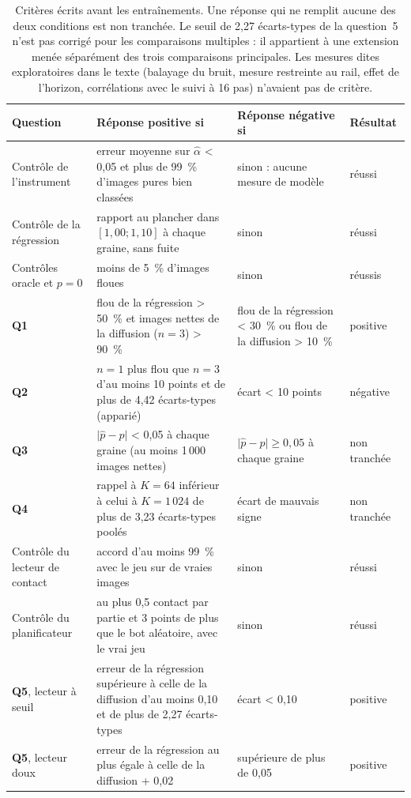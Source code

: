 \documentclass[a4paper, 11pt]{article}
\newcommand{\ahat}{\hat\alpha}
\newcommand{\phat}{\hat p}
\newcommand{\Q}[1]{\textbf{Q#1}}
\begin{document}
\begin{table}[H]
  \centering\footnotesize
  \begin{tabularx}{\linewidth}{@{}lYYl@{}}
    \toprule
    Question & Réponse positive si & Réponse négative si & Résultat \\
    \midrule
    Contrôle de l'instrument & erreur moyenne sur $\ahat$ < 0,05 et plus de 99~\% d'images pures bien classées & sinon : aucune mesure de modèle & réussi \\
    Contrôle de la régression & rapport au plancher dans $[1{,}00 ; 1{,}10]$ à chaque graine, sans fuite & sinon & réussi \\
    Contrôles oracle et $p = 0$ & moins de 5~\% d'images floues & sinon & réussis \\
    \Q1 & flou de la régression > 50~\% et images nettes de la diffusion ($n = 3$) > 90~\% & flou de la régression < 30~\% ou flou de la diffusion > 10~\% & positive \\
    \Q2 & $n = 1$ plus flou que $n = 3$ d'au moins 10 points et de plus de 4,42 écarts-types (apparié) & écart < 10 points & négative \\
    \Q3 & $\lvert\phat - p\rvert$ < 0,05 à chaque graine (au moins 1\,000 images nettes) & $\lvert\phat - p\rvert \ge 0{,}05$ à chaque graine & non tranchée \\
    \Q4 & rappel à $K = 64$ inférieur à celui à $K = 1\,024$ de plus de 3,23 écarts-types poolés & écart de mauvais signe & non tranchée \\
    Contrôle du lecteur de contact & accord d'au moins 99~\% avec le jeu sur de vraies images & sinon & réussi \\
    Contrôle du planificateur & au plus 0,5 contact par partie et 3 points de plus que le bot aléatoire, avec le vrai jeu & sinon & réussi \\
    \Q5, lecteur à seuil & erreur de la régression supérieure à celle de la diffusion d'au moins 0,10 et de plus de 2,27 écarts-types & écart < 0,10 & positive \\
    \Q5, lecteur doux & erreur de la régression au plus égale à celle de la diffusion + 0,02 & supérieure de plus de 0,05 & positive \\
    \bottomrule
  \end{tabularx}
  \caption{Critères écrits avant les entraînements. Une réponse qui ne remplit aucune des deux conditions est non tranchée.
  Le seuil de 2,27 écarts-types de la question~5 n'est pas corrigé pour les comparaisons multiples : il appartient à une
  extension menée séparément des trois comparaisons principales. Les mesures dites exploratoires dans le texte (balayage du
  bruit, mesure restreinte au rail, effet de l'horizon, corrélations avec le suivi à 16 pas) n'avaient pas de critère.}
  \label{tab:criteres}
\end{table}
\end{document}
